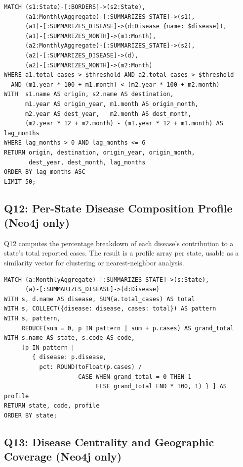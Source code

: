 \documentclass[12pt,a4paper]{article}
\begin{document}
\begin{lstlisting}[language=cypher, caption={Q11: Neo4j. Border-adjacent state pairs with a positive, bounded month lag.}]
MATCH (s1:State)-[:BORDERS]->(s2:State),
      (a1:MonthlyAggregate)-[:SUMMARIZES_STATE]->(s1),
      (a1)-[:SUMMARIZES_DISEASE]->(d:Disease {name: $disease}),
      (a1)-[:SUMMARIZES_MONTH]->(m1:Month),
      (a2:MonthlyAggregate)-[:SUMMARIZES_STATE]->(s2),
      (a2)-[:SUMMARIZES_DISEASE]->(d),
      (a2)-[:SUMMARIZES_MONTH]->(m2:Month)
WHERE a1.total_cases > $threshold AND a2.total_cases > $threshold
  AND (m1.year * 100 + m1.month) < (m2.year * 100 + m2.month)
WITH  s1.name AS origin, s2.name AS destination,
      m1.year AS origin_year, m1.month AS origin_month,
      m2.year AS dest_year,   m2.month AS dest_month,
      (m2.year * 12 + m2.month) - (m1.year * 12 + m1.month) AS lag_months
WHERE lag_months > 0 AND lag_months <= 6
RETURN origin, destination, origin_year, origin_month,
       dest_year, dest_month, lag_months
ORDER BY lag_months ASC
LIMIT 50;
\end{lstlisting}


\subsection*{Q12: Per-State Disease Composition Profile (Neo4j only)}

Q12 computes the percentage breakdown of each disease's contribution to a state's total reported cases. The result is a profile array per state, usable as a similarity vector for clustering or nearest-neighbor analysis.

\begin{lstlisting}[language=cypher, caption={Q12: Neo4j. \texttt{REDUCE} computes the grand total; a list comprehension produces the per-disease percentages.}]
MATCH (a:MonthlyAggregate)-[:SUMMARIZES_STATE]->(s:State),
      (a)-[:SUMMARIZES_DISEASE]->(d:Disease)
WITH s, d.name AS disease, SUM(a.total_cases) AS total
WITH s, COLLECT({disease: disease, cases: total}) AS pattern
WITH s, pattern,
     REDUCE(sum = 0, p IN pattern | sum + p.cases) AS grand_total
WITH s.name AS state, s.code AS code,
     [p IN pattern |
        { disease: p.disease,
          pct: ROUND(toFloat(p.cases) /
                     CASE WHEN grand_total = 0 THEN 1
                          ELSE grand_total END * 100, 1) } ] AS profile
RETURN state, code, profile
ORDER BY state;
\end{lstlisting}


\subsection*{Q13: Disease Centrality and Geographic Coverage (Neo4j only)}
\end{document}
